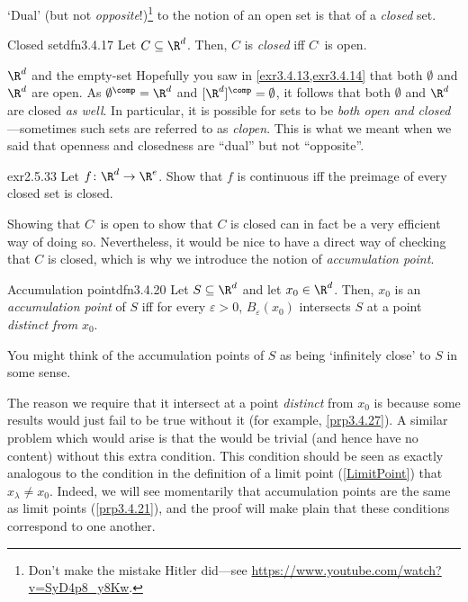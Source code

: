 `Dual' (but not \emph{opposite}!)\footnote{Don't make the mistake Hitler did---see \url{https://www.youtube.com/watch?v=SyD4p8_y8Kw}.} to the notion of an open set is that of a \emph{closed} set.
\begin{dfn}{Closed set}{dfn3.4.17}
Let $C\subseteq \R ^d$.  Then, $C$ is \emph{closed} iff $C^{\comp}$ is open.
\end{dfn}
\begin{exm}{$\R ^d$ and the empty-set}{}
Hopefully you saw in \cref{exr3.4.13,exr3.4.14} that both $\emptyset$ and $\R ^d$ are open.  As $\emptyset ^{\comp}=\R ^d$ and $[\R ^d]^{\comp}=\emptyset$, it follows that both $\emptyset$ and $\R ^d$ are closed \emph{as well}.  In particular, it is possible for sets to be \emph{both open and closed}---sometimes such sets are referred to as \emph{clopen}.  This is what we meant when we said that openness and closedness are ``dual'' but not ``opposite''.
\end{exm}
\begin{exr}{}{exr2.5.33}
Let $f\colon \R ^d\rightarrow \R ^e$.  Show that $f$ is continuous iff the preimage of every closed set is closed.
\end{exr}
Showing that $C^{\comp}$ is open to show that $C$ is closed can in fact be a very efficient way of doing so.  Nevertheless, it would be nice to have a direct way of checking that $C$ is closed, which is why we introduce the notion of \emph{accumulation point}.
\begin{dfn}{Accumulation point}{dfn3.4.20}
Let $S\subseteq \R ^d$ and let $x_0\in \R ^d$.  Then, $x_0$ is an \emph{accumulation point} of $S$ iff for every $\varepsilon >0$, $B_\varepsilon (x_0)$ intersects $S$ at a point \emph{distinct from} $x_0$.
\begin{rmk}
You might think of the accumulation points of $S$ as being `infinitely close' to $S$ in some sense.
\end{rmk}
\begin{rmk}
The reason we require that it intersect at a point \emph{distinct} from $x_0$ is because some results would just fail to be true without it (for example, \cref{prp3.4.27}).  A similar problem which would arise is that the  would be trivial (and hence have no content) without this extra condition.  This condition should be seen as exactly analogous to the condition in the definition of a limit point (\cref{LimitPoint}) that $x_{\lambda}\neq x_0$.  Indeed, we will see momentarily that accumulation points are the same as limit points (\cref{prp3.4.21}), and the proof will make plain that these conditions correspond to one another.
\end{rmk}
\end{dfn}
